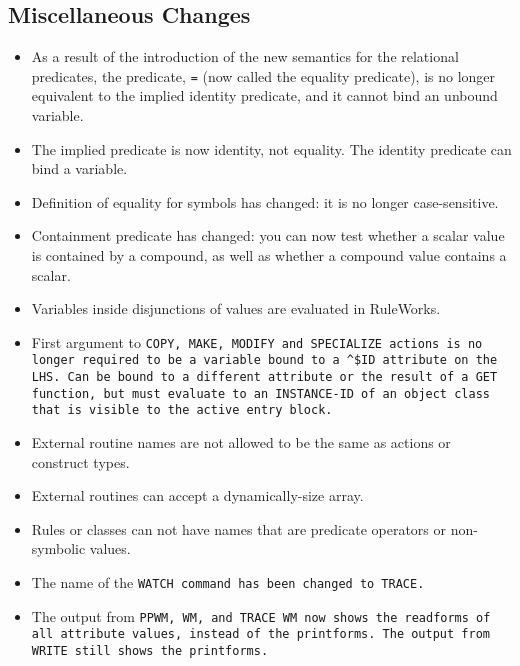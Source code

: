 \subsection{Miscellaneous Changes}

\begin{itemize}
\item As a result of the introduction of the new semantics for the
  relational predicates, the predicate, \verb|=| (now called the equality
  predicate), is no longer equivalent to the implied identity
  predicate, and it cannot bind an unbound variable.

\item The implied predicate is now identity, not equality. The
  identity predicate can bind a variable.

\item Definition of equality for symbols has changed: it is no longer
  case-sensitive.

\item Containment predicate has changed: you can now test whether a
  scalar value is contained by a compound, as well as whether a
  compound value contains a scalar.

\item Variables inside disjunctions of values are evaluated in
  RuleWorks.

\item First argument to \tt{COPY}, \tt{MAKE}, \tt{MODIFY} and
  \tt{SPECIALIZE} actions is no longer required to be a variable bound
  to a \verb|^$ID| attribute on the LHS. Can be bound to a different
  attribute or the result of a \tt{GET} function, but must evaluate to
  an \tt{INSTANCE-ID} of an object class that is visible to the active
  entry block.

\item External routine names are not allowed to be the same as actions
  or construct types.

\item External routines can accept a dynamically-size array.

\item Rules or classes can not have names that are predicate operators
  or non-symbolic values.

\item The name of the \tt{WATCH} command has been changed to
  \tt{TRACE}.

\item The output from \tt{PPWM}, \tt{WM}, and \tt{TRACE} \tt{WM} now shows the
  readforms of all attribute values, instead of the printforms. The
  output from \tt{WRITE} still shows the printforms.


\end{itemize}
